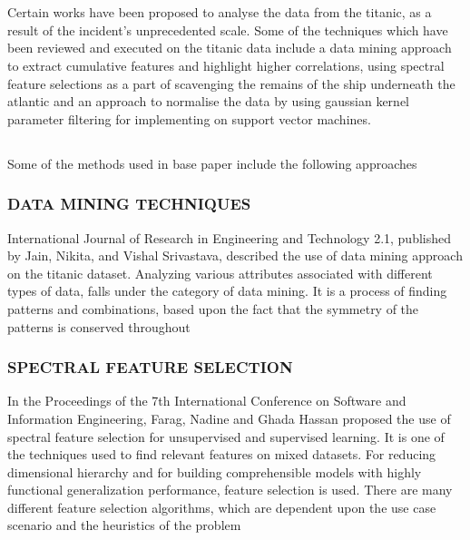 \documentclass[12pt]{article}
\newcommand{\secsize}{\fontsize{15pt}{12pt}\selectfont}
\newcommand{\subsize}{\fontsize{14pt}{12pt}\selectfont}
\begin{document}
\section{\textbf{\secsize{LITERATURE REVIEW}}}
Certain works have been proposed to analyse the data from the titanic, as a result of the incident's unprecedented scale.  Some of the techniques which have been reviewed and executed on the titanic data include a data mining approach to extract cumulative features and highlight higher correlations, using spectral feature selections as a part of scavenging the remains of the ship underneath the atlantic and an approach to normalise the data by using gaussian kernel parameter filtering for implementing on support vector machines. 

\newpage

\subsection{\textbf{\subsize{METHODS USED IN BASE PAPER}}}
Some of the methods used in base paper include the following approaches 

\subsubsection{\textbf{DATA MINING TECHNIQUES}}
 International Journal of Research in Engineering and Technology 2.1, published by Jain, Nikita, and Vishal Srivastava, described the use of data mining approach on the titanic dataset. Analyzing various attributes associated with different types of data, falls under the category of data mining. It is a process of finding patterns and combinations, based upon the fact that the symmetry of the patterns is conserved throughout 

\subsubsection{\textbf{SPECTRAL FEATURE SELECTION}}
In the Proceedings of the 7th International Conference on Software and Information Engineering, Farag, Nadine and Ghada Hassan proposed the use of spectral feature selection for unsupervised and supervised learning. It is one of the techniques used to find relevant features on mixed datasets. For reducing dimensional  hierarchy and for building comprehensible models with highly functional generalization performance, feature selection is used. There are many different feature selection algorithms, which are dependent upon the use case scenario and the heuristics of the problem 
\end{document}
